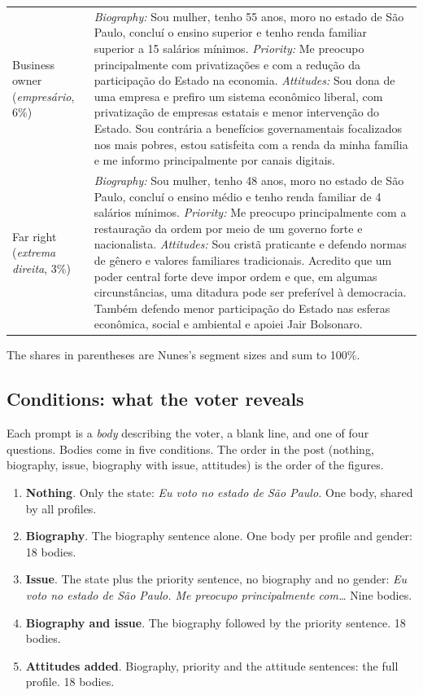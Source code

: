 \documentclass[11pt]{article}
\begin{document}
\begin{longtable}{@{}p{2.6cm}p{12.4cm}@{}}
\addlinespace
Business owner \newline (\emph{empresário}, 6\%) &
\emph{Biography:} Sou mulher, tenho 55 anos, moro no estado de São Paulo, concluí o ensino superior e tenho renda familiar superior a 15 salários mínimos.
\emph{Priority:} Me preocupo principalmente com privatizações e com a redução da participação do Estado na economia.
\emph{Attitudes:} Sou dona de uma empresa e prefiro um sistema econômico liberal, com privatização de empresas estatais e menor intervenção do Estado. Sou contrária a benefícios governamentais focalizados nos mais pobres, estou satisfeita com a renda da minha família e me informo principalmente por canais digitais. \\
\addlinespace
Far right \newline (\emph{extrema direita}, 3\%) &
\emph{Biography:} Sou mulher, tenho 48 anos, moro no estado de São Paulo, concluí o ensino médio e tenho renda familiar de 4 salários mínimos.
\emph{Priority:} Me preocupo principalmente com a restauração da ordem por meio de um governo forte e nacionalista.
\emph{Attitudes:} Sou cristã praticante e defendo normas de gênero e valores familiares tradicionais. Acredito que um poder central forte deve impor ordem e que, em algumas circunstâncias, uma ditadura pode ser preferível à democracia. Também defendo menor participação do Estado nas esferas econômica, social e ambiental e apoiei Jair Bolsonaro. \\
\end{longtable}

The shares in parentheses are Nunes's segment sizes and sum to 100\%.

\subsection{Conditions: what the voter reveals}

Each prompt is a \emph{body} describing the voter, a blank line, and one of four questions. Bodies come in five conditions. The order in the post (nothing, biography, issue, biography with issue, attitudes) is the order of the figures.

\begin{enumerate}[leftmargin=1.6em]
  \item \textbf{Nothing}. Only the state: \emph{Eu voto no estado de São Paulo.} One body, shared by all profiles.
  \item \textbf{Biography}. The biography sentence alone. One body per profile and gender: 18 bodies.
  \item \textbf{Issue}. The state plus the priority sentence, no biography and no gender: \emph{Eu voto no estado de São Paulo. Me preocupo principalmente com\ldots} Nine bodies.
  \item \textbf{Biography and issue}. The biography followed by the priority sentence. 18 bodies.
  \item \textbf{Attitudes added}. Biography, priority and the attitude sentences: the full profile. 18 bodies.
\end{enumerate}
\end{document}
